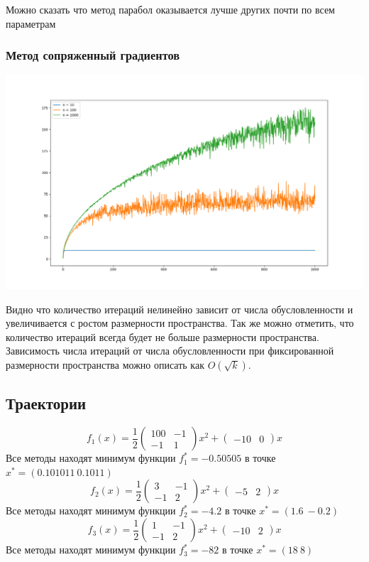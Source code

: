 \documentclass[english]{article}
\begin{document}
Можно сказать что метод парабол оказывается лучше других почти по всем параметрам

\subsubsection{Метод сопряженный градиентов}
\begin{center}
    \includegraphics[scale=0.4]{plots/conjugate_gradient_1.png}
\end{center}
Видно что количество итераций нелинейно зависит от числа
обусловленности и увеличивается с ростом размерности пространства. Так
же можно отметить, что количество итераций всегда будет не больше
размерности пространства. Зависимость числа итераций от числа
обусловленности при фиксированной размерности пространства можно
описать как \(O(\sqrt{k})\).

\subsection{Траектории}
\[ f_1(x) = \frac{1}{2}\begin{pmatrix}
100 & -1 \\
-1 & 1
\end{pmatrix} x^2 + \begin{pmatrix} -10 & 0 \end{pmatrix}x\]
Все методы находят минимум функции \(f_1^* = -0.50505\) в точке \(x^* = (0.101011\ 0.1011)\)
\[ f_2(x) = \frac{1}{2}\begin{pmatrix}
3 & -1 \\
-1 & 2
\end{pmatrix} x^2 + \begin{pmatrix} -5 & 2 \end{pmatrix}x\]
Все методы находят минимум функции \(f_2^* = -4.2\) в точке \(x^* = (1.6\ -0.2)\)
\[ f_3(x) = \frac{1}{2}\begin{pmatrix}
1 & -1 \\
-1 & 2
\end{pmatrix} x^2 + \begin{pmatrix} -10 & 2 \end{pmatrix}x\]
Все методы находят минимум функции \(f_3^* = -82\) в точке \(x^* = (18\ 8)\) \\
\end{document}
